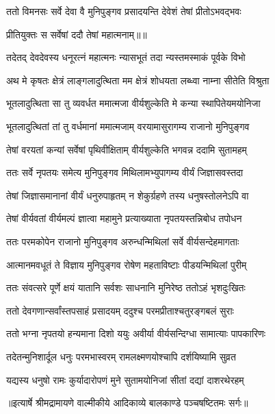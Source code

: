 \twolineshloka
{ततो विमनसः सर्वे देवा वै मुनिपुङ्गव}
{प्रसादयन्ति देवेशं तेषां प्रीतोऽभवद्भवः} %

{प्रीतियुक्तः स सर्वेषां ददौ तेषां महात्मनाम्॥॥} %

\addtocounter{shlokacount}{1}

\twolineshloka
{तदेतद् देवदेवस्य धनूरत्नं महात्मनः}
{न्यासभूतं तदा न्यस्तमस्माकं पूर्वके विभो} %

\twolineshloka
{अथ मे कृषतः क्षेत्रं लाङ्गलादुत्थिता मम}
{क्षेत्रं शोधयता लब्ध्वा नाम्ना सीतेति विश्रुता} %

\twolineshloka
{भूतलादुत्थिता सा तु व्यवर्धत ममात्मजा}
{वीर्यशुल्केति मे कन्या स्थापितेयमयोनिजा} %

\twolineshloka
{भूतलादुत्थितां तां तु वर्धमानां ममात्मजाम्}
{वरयामासुरागम्य राजानो मुनिपुङ्गव} %

\twolineshloka
{तेषां वरयतां कन्यां सर्वेषां पृथिवीक्षिताम्}
{वीर्यशुल्केति भगवन्न ददामि सुतामहम्} %

\twolineshloka
{ततः सर्वे नृपतयः समेत्य मुनिपुङ्गव}
{मिथिलामभ्युपागम्य वीर्यं जिज्ञासवस्तदा} %

\twolineshloka
{तेषां जिज्ञासमानानां वीर्यं धनुरुपाहृतम्}
{न शेकुर्ग्रहणे तस्य धनुषस्तोलनेऽपि वा} %

\twolineshloka
{तेषां वीर्यवतां वीर्यमल्पं ज्ञात्वा महामुने}
{प्रत्याख्याता नृपतयस्तन्निबोध तपोधन} %

\twolineshloka
{ततः परमकोपेन राजानो मुनिपुङ्गव}
{अरुन्धन्मिथिलां सर्वे वीर्यसन्देहमागताः} %

\twolineshloka
{आत्मानमवधूतं ते विज्ञाय मुनिपुङ्गव}
{रोषेण महताविष्टाः पीडयन्मिथिलां पुरीम्} %

\twolineshloka
{ततः संवत्सरे पूर्णे क्षयं यातानि सर्वशः}
{साधनानि मुनिरेष्ठ ततोऽहं भृशदुःखितः} %

\twolineshloka
{ततो देवगणान्सर्वांस्तपसाहं प्रसादयम्}
{ददुश्च परमप्रीताश्चतुरङ्गबलं सुराः} %

\twolineshloka
{ततो भग्ना नृपतयो हन्यमाना दिशो ययुः}
{अवीर्या वीर्यसन्दिग्धा सामात्याः पापकारिणः} %

\twolineshloka
{तदेतन्मुनिशार्दूल धनुः परमभास्वरम्}
{रामलक्ष्मणयोश्चापि दर्शयिष्यामि सुव्रत} %

\twolineshloka
{यद्यस्य धनुषो रामः कुर्यादारोपणं मुने}
{सुतामयोनिजां सीतां दद्यां दाशरथेरहम्} %


{॥इत्यार्षे श्रीमद्रामायणे वाल्मीकीये आदिकाव्ये बालकाण्डे पञ्चषष्टितमः सर्गः॥}

